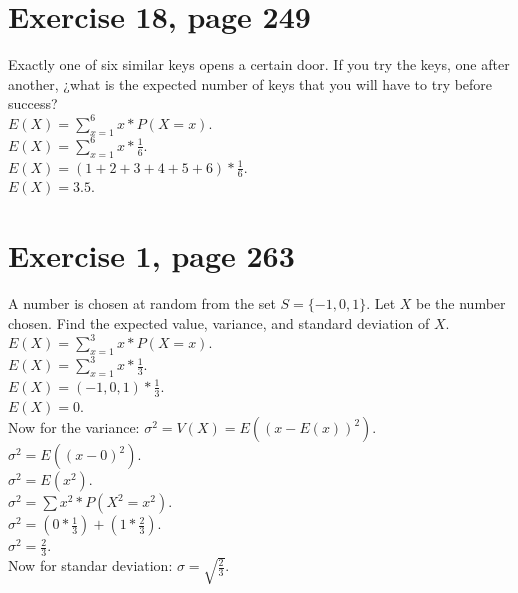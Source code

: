 \documentclass[]{article}
\begin{document}
\section{Exercise 18, page 249}
Exactly one of six similar keys opens a certain door. If you try the keys, one after another, ¿what is the expected number of keys that you will have to try before success?\\
$E(X) = \sum_{x = 1}^{6} x * P(X = x)$.\\
$E(X) = \sum_{x = 1}^{6} x * \frac{1}{6}$.\\
$E(X) = (1+2+3+4+5+6)* \frac{1}{6}$.\\
$E(X) = 3.5$.\\

\section{Exercise 1, page 263}
A number is chosen at random from the set $S = \{-1, 0, 1\}	$. Let $X$ be the number chosen. Find the expected value, variance, and standard deviation of $X$.\\
$E(X) = \sum_{x = 1}^{3} x * P(X = x)$.\\
$E(X) = \sum_{x = 1}^{3} x * \frac{1}{3}$.\\
$E(X) = (-1, 0, 1)* \frac{1}{3}$.\\
$E(X) = 0$.\\
Now for the variance:
$\sigma^{2} = V(X) = E((x-E(x))^{2})$.\\
$\sigma^{2} = E((x-0)^{2})$.\\
$\sigma^{2} = E(x^{2})$.\\
$\sigma^{2} = \sum x^{2} * P(X^{2} = x^{2})$.\\
$\sigma^{2}  = (0 * \frac{1}{3}) + (1 * \frac{2}{3})$.\\
$\sigma^{2}  = \frac{2}{3}$.\\
Now for standar deviation:
$\sigma = \sqrt{\frac{2}{3}}$.\\
\end{document}
